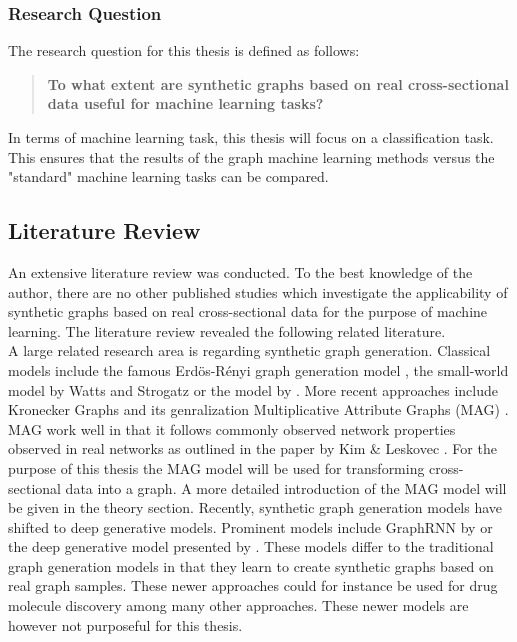 	\subsubsection{Research Question}

	The research question for this thesis is defined as follows:

	\begin{quote}
		\item \textbf{To what extent are synthetic graphs based on real cross-sectional
			data useful for machine learning tasks?}
	\end{quote}

	\noindent In terms of machine learning task, this thesis will focus on a
	classification task. This ensures that the results of the graph machine
	learning methods versus the "standard" machine learning tasks can be
	compared.

	\subsection{Literature Review}

	An extensive literature review was conducted. To the best knowledge of the
	author, there are no other published studies which investigate the
	applicability of synthetic graphs based on real cross-sectional data for
	the purpose of machine learning. The literature review revealed the
	following related literature.
	\\

	\noindent A large related research area is regarding synthetic 
	graph generation. Classical models include the famous Erdös-Rényi graph
	generation model \citep{erdos2011evolution}, the small-world model by
	Watts and Strogatz \citeyearpar{watts1998collective} or the model by
	\cite{barabasi1999emergence}. More recent approaches include Kronecker Graphs 
	\citep{leskovec2010kronecker} and its genralization 
	Multiplicative Attribute Graphs (MAG) \citep{kim2012multiplicative}. 
	MAG work well in that it follows commonly observed network properties observed 
	in real networks as outlined in the paper by Kim \& Leskovec
	\citeyearpar{kim2012multiplicative}. 
	For the purpose of this thesis the MAG model will be used for transforming 
	cross-sectional data into a graph. A more detailed introduction of the MAG 
	model will be given in the theory section. Recently, synthetic graph generation 
	models have shifted to deep generative models. Prominent models include 
	GraphRNN by \cite{you2018graphrnn} or the deep generative model presented
	by \cite{li2018learning}. These models differ to the traditional graph
	generation models in that they learn to create synthetic graphs based on
	real graph samples. These newer approaches could for instance be used for
	drug molecule discovery among many other approaches. These newer models are
	however not purposeful for this thesis. 
